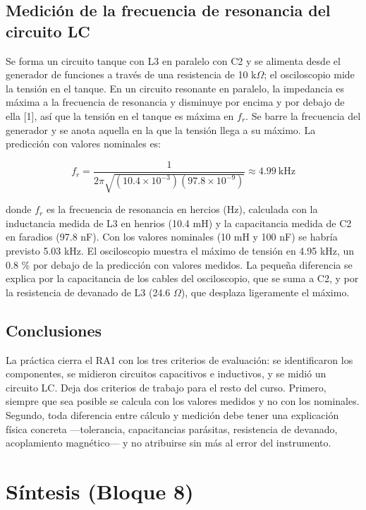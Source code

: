 \documentclass[11pt,letterpaper]{article}
\begin{document}
\subsection{Medición de la frecuencia de resonancia del circuito LC}

Se forma un circuito tanque con L3 en paralelo con C2 y se alimenta desde el generador de funciones a través de una resistencia de 10 k\ensuremath{\Omega}; el osciloscopio mide la tensión en el tanque. En un circuito resonante en paralelo, la impedancia es máxima a la frecuencia de resonancia y disminuye por encima y por debajo de ella [1], así que la tensión en el tanque es máxima en $f_r$. Se barre la frecuencia del generador y se anota aquella en la que la tensión llega a su máximo. La predicción con valores nominales es:

\begin{equation}
  f_r = \frac{1}{2\pi\sqrt{(10.4 \times 10^{-3})(97.8 \times 10^{-9})}} \approx 4.99\ \text{kHz}
\end{equation}

donde $f_r$ es la frecuencia de resonancia en hercios (Hz), calculada con la inductancia medida de L3 en henrios (10.4 mH) y la capacitancia medida de C2 en faradios (97.8 nF). Con los valores nominales (10 mH y 100 nF) se habría previsto 5.03 kHz. El osciloscopio muestra el máximo de tensión en 4.95 kHz, un 0.8 \% por debajo de la predicción con valores medidos. La pequeña diferencia se explica por la capacitancia de los cables del osciloscopio, que se suma a C2, y por la resistencia de devanado de L3 (24.6 \ensuremath{\Omega}), que desplaza ligeramente el máximo.

\subsection{Conclusiones}

La práctica cierra el RA1 con los tres criterios de evaluación: se identificaron los componentes, se midieron circuitos capacitivos e inductivos, y se midió un circuito LC. Deja dos criterios de trabajo para el resto del curso. Primero, siempre que sea posible se calcula con los valores medidos y no con los nominales. Segundo, toda diferencia entre cálculo y medición debe tener una explicación física concreta ---tolerancia, capacitancias parásitas, resistencia de devanado, acoplamiento magnético--- y no atribuirse sin más al \guillemotleft{}error del instrumento\guillemotright{}.

\section{Síntesis (Bloque 8)}
\end{document}
